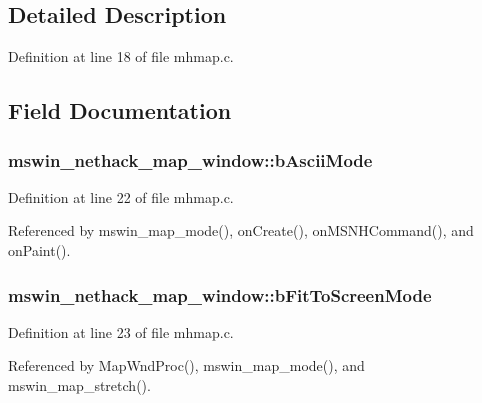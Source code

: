 \subsection{Detailed Description}


Definition at line 18 of file mhmap.\+c.



\subsection{Field Documentation}
\hypertarget{structmswin__nethack__map__window_ae71a1d1da2f65a81cdd0ea0cbad8052a}{
\subsubsection[{b\+Ascii\+Mode}]{ mswin\+\_\+nethack\+\_\+map\+\_\+window\+::b\+Ascii\+Mode}}\label{structmswin__nethack__map__window_ae71a1d1da2f65a81cdd0ea0cbad8052a}


Definition at line 22 of file mhmap.\+c.



Referenced by mswin\+\_\+map\+\_\+mode(), on\+Create(), on\+M\+S\+N\+H\+Command(), and on\+Paint().

\hypertarget{structmswin__nethack__map__window_adcc464e3ebe6973032310a740e332bed}{
\subsubsection[{b\+Fit\+To\+Screen\+Mode}]{ mswin\+\_\+nethack\+\_\+map\+\_\+window\+::b\+Fit\+To\+Screen\+Mode}}\label{structmswin__nethack__map__window_adcc464e3ebe6973032310a740e332bed}


Definition at line 23 of file mhmap.\+c.



Referenced by Map\+Wnd\+Proc(), mswin\+\_\+map\+\_\+mode(), and mswin\+\_\+map\+\_\+stretch().

